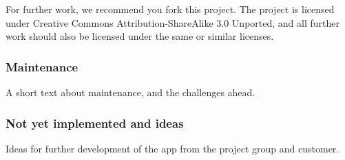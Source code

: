 For further work, we recommend you fork this project. The project is licensed under Creative Commons Attribution-ShareAlike 3.0 Unported, and all further work should also be licensed under the same or similar licenses. 

\subsubsection{Maintenance}
A short text about maintenance, and the challenges ahead.

\subsubsection{Not yet implemented and ideas}
Ideas for further development of the app from the project group and customer.

